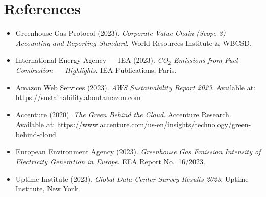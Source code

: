 \chapter*{References}

\begin{itemize}[label={}, leftmargin=1.5em, itemsep=0.3em]
  \item Greenhouse Gas Protocol (2023). \textit{Corporate Value Chain
    (Scope 3) Accounting and Reporting Standard}. World Resources
    Institute \& WBCSD.
  \item International Energy Agency --- IEA (2023). \textit{CO$_2$
    Emissions from Fuel Combustion --- Highlights}. IEA Publications,
    Paris.
  \item Amazon Web Services (2023). \textit{AWS Sustainability Report
    2023}. Available at: \url{https://sustainability.aboutamazon.com}
  \item Accenture (2020). \textit{The Green Behind the Cloud}. Accenture
    Research. Available at:
    \url{https://www.accenture.com/us-en/insights/technology/green-behind-cloud}
  \item European Environment Agency (2023). \textit{Greenhouse Gas
    Emission Intensity of Electricity Generation in Europe}. EEA Report
    No.~16/2023.
  \item Uptime Institute (2023). \textit{Global Data Center Survey Results
    2023}. Uptime Institute, New York.
\end{itemize}

